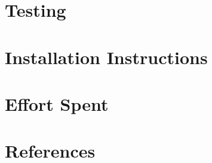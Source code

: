\documentclass{ConfigurationFiles/Politecnico_Di_Milano}
\begin{document}
 \chapter{Testing}
\label{ch:implementation_integration_test_plan}


    \chapter{Installation Instructions}
    \label{ch:effort_spent}%
    

     \chapter{Effort Spent}
    \label{ch:effort_spents}%
    


    \chapter{References}
    \label{ch:references}%
    

    \listoftables
    \cleardoublepage
\end{document}
